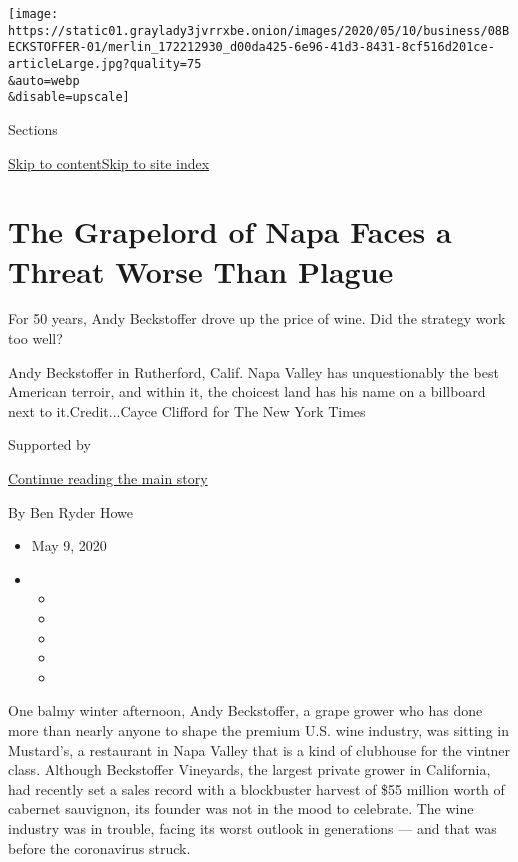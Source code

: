 \texttt{[image: https://static01.graylady3jvrrxbe.onion/images/2020/05/10/business/08BECKSTOFFER-01/merlin\_172212930\_d00da425-6e96-41d3-8431-8cf516d201ce-articleLarge.jpg?quality=75\\\&auto=webp\\\&disable=upscale]}

Sections

\protect\hyperlink{site-content}{Skip to
content}\protect\hyperlink{site-index}{Skip to site index}

\hypertarget{the-grapelord-of-napa-faces-a-threat-worse-than-plague}{%
\section{The Grapelord of Napa Faces a Threat Worse Than
Plague}\label{the-grapelord-of-napa-faces-a-threat-worse-than-plague}}

For 50 years, Andy Beckstoffer drove up the price of wine. Did the
strategy work too well?

Andy Beckstoffer in Rutherford, Calif. Napa Valley has unquestionably
the best American terroir, and within it, the choicest land has his name
on a billboard next to it.Credit...Cayce Clifford for The New York Times

Supported by

\protect\hyperlink{after-sponsor}{Continue reading the main story}

By Ben Ryder Howe

\begin{itemize}
\item
  May 9, 2020
\item
  \begin{itemize}
  \item
  \item
  \item
  \item
  \item
  \end{itemize}
\end{itemize}

One balmy winter afternoon, Andy Beckstoffer, a grape grower who has
done more than nearly anyone to shape the premium U.S. wine industry,
was sitting in Mustard's, a restaurant in Napa Valley that is a kind of
clubhouse for the vintner class. Although Beckstoffer Vineyards, the
largest private grower in California, had recently set a sales record
with a blockbuster harvest of \$55 million worth of cabernet sauvignon,
its founder was not in the mood to celebrate. The wine industry was in
trouble, facing its worst outlook in generations --- and that was before
the coronavirus struck.

